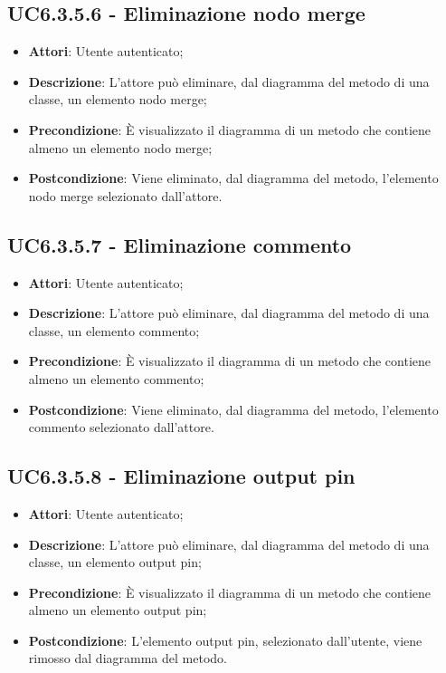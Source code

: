 \subsection{UC6.3.5.6 - Eliminazione nodo merge} 
\label{ssec:UC6.3.5.6} 
\begin{itemize} 
\item \textbf{Attori}: Utente autenticato;
\item \textbf{Descrizione}: L'attore può eliminare, dal diagramma del metodo di una classe, un elemento nodo merge;
\item \textbf{Precondizione}: È visualizzato il diagramma di un metodo che contiene almeno un elemento nodo merge;
\item \textbf{Postcondizione}: Viene eliminato, dal diagramma del metodo,  l'elemento nodo merge selezionato dall'attore.
\end{itemize} 
\subsection{UC6.3.5.7 - Eliminazione commento} 
\label{ssec:UC6.3.5.7} 
\begin{itemize} 
\item \textbf{Attori}: Utente autenticato;
\item \textbf{Descrizione}: L'attore può eliminare, dal diagramma del metodo di una classe, un elemento commento;
\item \textbf{Precondizione}: È visualizzato il diagramma di un metodo che contiene almeno un elemento commento;
\item \textbf{Postcondizione}: Viene eliminato, dal diagramma del metodo,  l'elemento commento selezionato dall'attore.
\end{itemize} 
\subsection{UC6.3.5.8 - Eliminazione output pin} 
\label{ssec:UC6.3.5.8} 
\begin{itemize} 
\item \textbf{Attori}: Utente autenticato;
\item \textbf{Descrizione}: L'attore può eliminare, dal diagramma del metodo di una classe, un elemento output pin;
\item \textbf{Precondizione}: È visualizzato il diagramma di un metodo che contiene almeno un elemento output pin;
\item \textbf{Postcondizione}: L'elemento output pin, selezionato dall'utente, viene rimosso dal diagramma del metodo.
\end{itemize} 
